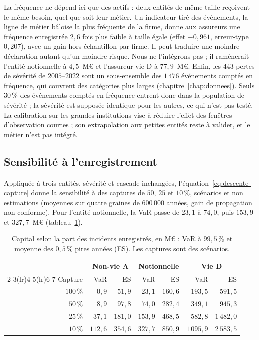 La fréquence ne dépend ici que des actifs : deux entités de même taille reçoivent le même besoin, quel que
soit leur métier. Un indicateur tiré des événements, la ligne de métier bâloise la plus fréquente de la
firme, donne aux assureurs une fréquence enregistrée $2{,}6$ fois plus faible à taille égale (effet
$-0{,}961$, erreur-type $0{,}207$), avec un gain hors échantillon par firme. Il peut traduire une moindre
déclaration autant qu'un moindre risque. Nous ne l'intégrons pas ; il ramènerait l'entité notionnelle à $4{,}5$~M\euro{}
et l'assureur vie D à $77{,}9$~M\euro. Enfin, les $443$ pertes de sévérité de $2005$--$2022$ sont un
sous-ensemble des $1\,476$ événements comptés en fréquence, qui couvrent des catégories plus larges
(chapitre~\ref{chap:donnees}). Seuls $30\,\%$ des événements comptés en fréquence entrent donc dans la
population de sévérité ; la sévérité est supposée identique pour les autres, ce qui n'est pas testé.
La calibration sur les grandes institutions vise à réduire l'effet des fenêtres
d'observation courtes ; son extrapolation aux petites entités reste à valider, et le métier n'est pas intégré.

\subsection{Sensibilité à l'enregistrement}
\label{sec:entites-capture}

Appliquée à trois entités, sévérité et cascade inchangées, l'équation~\eqref{eq:descente-capture}
donne la sensibilité à des captures de $50$, $25$ et $10\,\%$, scénarios et non estimations (moyennes sur
quatre graines de $600\,000$ années, gain de propagation non conforme). Pour l'entité notionnelle, la VaR
passe de $23{,}1$ à $74{,}0$, puis $153{,}9$ et $327{,}7$~M\euro{} (tableau~\ref{tab:entites-capture}).

\begin{table}[htbp]\centering\small
\setlength{\tabcolsep}{5pt}
\begin{tabular}{@{}r rr rr rr@{}}
\toprule
 & \multicolumn{2}{c}{Non-vie A} & \multicolumn{2}{c}{Notionnelle} & \multicolumn{2}{c}{Vie D} \\
\cmidrule(lr){2-3}\cmidrule(lr){4-5}\cmidrule(lr){6-7}
Capture & VaR & ES & VaR & ES & VaR & ES \\
\midrule
$100\,\%$ & $0{,}9$ & $51{,}9$ & $23{,}1$ & $160{,}6$ & $193{,}5$ & $591{,}5$ \\
$50\,\%$ & $8{,}9$ & $97{,}8$ & $74{,}0$ & $282{,}4$ & $349{,}1$ & $945{,}3$ \\
$25\,\%$ & $37{,}1$ & $181{,}0$ & $153{,}9$ & $468{,}5$ & $582{,}8$ & $1\,482{,}0$ \\
$10\,\%$ & $112{,}6$ & $354{,}6$ & $327{,}7$ & $850{,}9$ & $1\,095{,}9$ & $2\,583{,}5$ \\
\bottomrule
\end{tabular}
\caption{Capital selon la part des incidents enregistrés, en M\euro{} : VaR à $99{,}5\,\%$ et moyenne des
$0{,}5\,\%$ pires années (ES). Les captures sont des scénarios.}
\label{tab:entites-capture}
\end{table}

